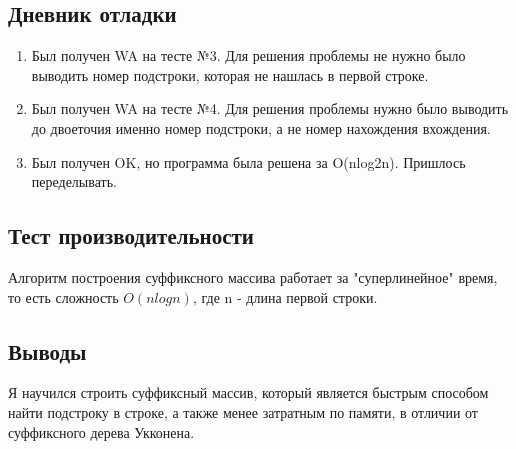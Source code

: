 \documentclass[12pt]{article}
\begin{document}
\newpage
\subsection*{Дневник отладки}

\begin{enumerate}
    \item Был получен WA на тесте №3. Для решения проблемы не нужно было выводить номер подстроки, которая не нашлась в первой строке.
    \item Был получен WA на тесте №4. Для решения проблемы нужно было выводить до двоеточия именно номер подстроки, а не номер нахождения вхождения.
    \item Был получен OK, но программа была решена за O(nlog2n). Пришлось переделывать.
\end{enumerate}

\newpage
\subsection*{Тест производительности}

Алгоритм построения суффиксного массива работает за "суперлинейное" время, то есть сложность $O(n log n)$, где n - длина первой строки.



\newpage
\subsection*{Выводы}


Я научился строить суффиксный массив, который является быстрым способом найти подстроку в строке, а также менее затратным по памяти, в отличии от суффиксного дерева Укконена. 
\end{document}
